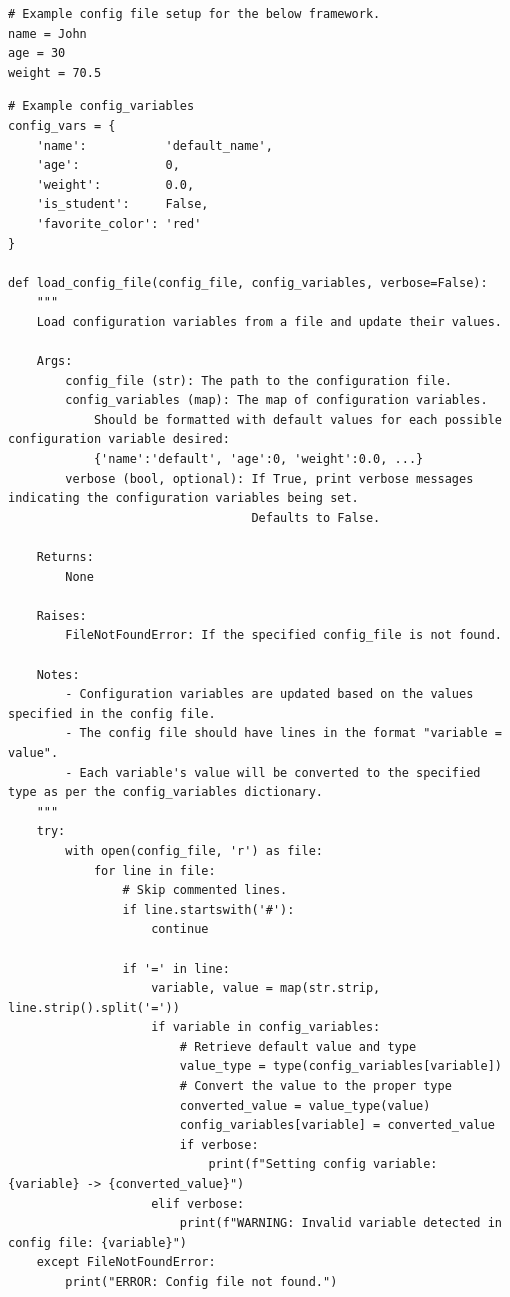 \begin{lstlisting}
# Example config file setup for the below framework.
name = John
age = 30
weight = 70.5
\end{lstlisting}

\begin{lstlisting}
# Example config_variables
config_vars = {
    'name':           'default_name',
    'age':            0,
    'weight':         0.0,
    'is_student':     False,
    'favorite_color': 'red'
}

def load_config_file(config_file, config_variables, verbose=False):
    """
    Load configuration variables from a file and update their values.

    Args:
        config_file (str): The path to the configuration file.
        config_variables (map): The map of configuration variables.
            Should be formatted with default values for each possible configuration variable desired:
            {'name':'default', 'age':0, 'weight':0.0, ...}
        verbose (bool, optional): If True, print verbose messages indicating the configuration variables being set. 
                                  Defaults to False.

    Returns:
        None

    Raises:
        FileNotFoundError: If the specified config_file is not found.

    Notes:
        - Configuration variables are updated based on the values specified in the config file.
        - The config file should have lines in the format "variable = value".
        - Each variable's value will be converted to the specified type as per the config_variables dictionary.
    """
    try:
        with open(config_file, 'r') as file:
            for line in file:
                # Skip commented lines.
                if line.startswith('#'):
                    continue

                if '=' in line:
                    variable, value = map(str.strip, line.strip().split('='))
                    if variable in config_variables:                        
                        # Retrieve default value and type
                        value_type = type(config_variables[variable])
                        # Convert the value to the proper type
                        converted_value = value_type(value)
                        config_variables[variable] = converted_value
                        if verbose:
                            print(f"Setting config variable: {variable} -> {converted_value}")
                    elif verbose:
                        print(f"WARNING: Invalid variable detected in config file: {variable}")                        
    except FileNotFoundError:
        print("ERROR: Config file not found.")
\end{lstlisting}







